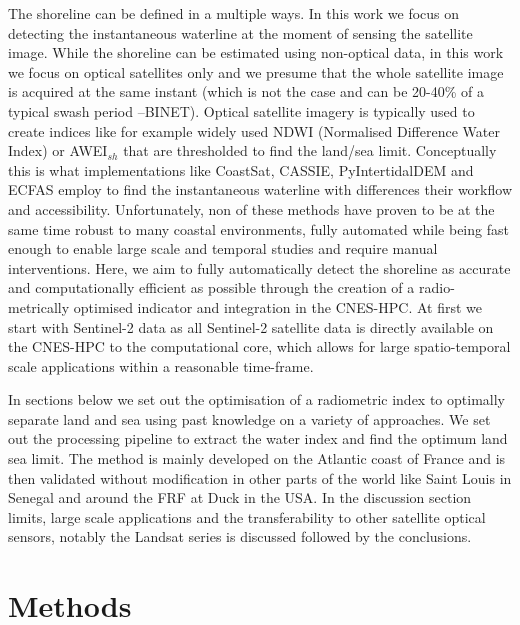 \documentclass[remotesensing,article,submit,pdftex,moreauthors]{Definitions/mdpi}
\begin{document}
The shoreline can be defined in a multiple ways. In this work we focus on detecting the instantaneous waterline at the moment of sensing the satellite image. While the shoreline can be estimated using non-optical data, in this work we focus on optical satellites only and we presume that the whole satellite image is acquired at the same instant (which is not the case and can be 20-40\% of a typical swash period --BINET). Optical satellite imagery is typically used to create indices like for example widely used NDWI (Normalised Difference Water Index) or AWEI$_{sh}$ that are thresholded to find the land/sea limit. Conceptually this is what implementations like CoastSat, CASSIE, PyIntertidalDEM and ECFAS employ to find the instantaneous waterline with differences their workflow and accessibility. Unfortunately, non of these methods have proven to be at the same time robust to many coastal environments, fully automated while being fast enough to enable large scale and temporal studies and require manual interventions. Here, we aim to fully automatically detect the shoreline as accurate and computationally efficient as possible through the creation of a radio-metrically optimised indicator and integration in the CNES-HPC. At first we start with Sentinel-2 data as all Sentinel-2 satellite data is directly available on the CNES-HPC to the computational core, which allows for large spatio-temporal scale applications within a reasonable time-frame.

In sections below we set out the optimisation of a radiometric index to optimally separate land and sea using past knowledge on a variety of approaches. We set out the processing pipeline to extract the water index and find the optimum land sea limit. The method is mainly developed on the Atlantic coast of France and is then validated without modification in other parts of the world like Saint Louis in Senegal and around the FRF at Duck in the USA. In the discussion section limits, large scale applications and the transferability to other satellite optical sensors, notably the Landsat series is discussed followed by the conclusions.

\section{Methods}
\end{document}
